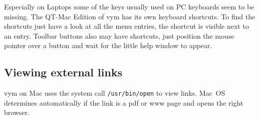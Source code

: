 \documentclass[12pt,a4paper]{article}
\newcommand{\vym}{{\sc vym }}
\begin{document}
Especially on Laptops some of the keys usually used on PC keyboards seem
to be missing. The QT-Mac Edition of \vym has its own keyboard
shortcuts. To find the shortcuts just have a look at all the menu
entries, the shortcut is visible next to an entry. Toolbar buttons also
may have shortcuts, just position the mouse pointer over a button and
wait for the little help window to appear. 

\subsection {Viewing external links}
\vym on Mac uses the system call {\tt /usr/bin/open} to view links.
Mac~OS determines automatically if the link is a pdf or www page and
opens the right browser.


\newpage
\end{document}
